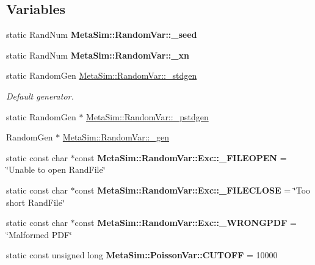 \subsection*{Variables}
\begin{DoxyCompactItemize}
\item 
static Rand\+Num {\bfseries Meta\+Sim\+::\+Random\+Var\+::\+\_\+seed}\hypertarget{group__metasim__random_gad037b5279195393ad61d448a631ef026}{}\label{group__metasim__random_gad037b5279195393ad61d448a631ef026}

\item 
static Rand\+Num {\bfseries Meta\+Sim\+::\+Random\+Var\+::\+\_\+xn}\hypertarget{group__metasim__random_ga942c2e335a84a00304b7920a6ee2c638}{}\label{group__metasim__random_ga942c2e335a84a00304b7920a6ee2c638}

\item 
static Random\+Gen \hyperlink{group__metasim__random_ga074de34f085259b7b9911e9f0a808d6b}{Meta\+Sim\+::\+Random\+Var\+::\+\_\+stdgen}\hypertarget{group__metasim__random_ga074de34f085259b7b9911e9f0a808d6b}{}\label{group__metasim__random_ga074de34f085259b7b9911e9f0a808d6b}

\begin{DoxyCompactList}\small\item\em Default generator. \end{DoxyCompactList}\item 
static Random\+Gen $\ast$ \hyperlink{group__metasim__random_ga920839e50710a224882a290bc132322d}{Meta\+Sim\+::\+Random\+Var\+::\+\_\+pstdgen}
\item 
Random\+Gen $\ast$ \hyperlink{group__metasim__random_ga64ccafdc8f32743c6b6bba7bfc1df4ff}{Meta\+Sim\+::\+Random\+Var\+::\+\_\+gen}
\item 
static const char $\ast$const {\bfseries Meta\+Sim\+::\+Random\+Var\+::\+Exc\+::\+\_\+\+F\+I\+L\+E\+O\+P\+EN} = \char`\"{}Unable to open Rand\+File\char`\"{}\hypertarget{group__metasim__random_gad70df72288377f42fcbbf83d02c58ae5}{}\label{group__metasim__random_gad70df72288377f42fcbbf83d02c58ae5}

\item 
static const char $\ast$const {\bfseries Meta\+Sim\+::\+Random\+Var\+::\+Exc\+::\+\_\+\+F\+I\+L\+E\+C\+L\+O\+SE} = \char`\"{}Too short Rand\+File\char`\"{}\hypertarget{group__metasim__random_ga0f916e4cb47dfc2db70f5a5f12f95ef7}{}\label{group__metasim__random_ga0f916e4cb47dfc2db70f5a5f12f95ef7}

\item 
static const char $\ast$const {\bfseries Meta\+Sim\+::\+Random\+Var\+::\+Exc\+::\+\_\+\+W\+R\+O\+N\+G\+P\+DF} = \char`\"{}Malformed P\+DF\char`\"{}\hypertarget{group__metasim__random_ga0560184f565fd1c7029cfc0fb8e9f106}{}\label{group__metasim__random_ga0560184f565fd1c7029cfc0fb8e9f106}

\item 
static const unsigned long {\bfseries Meta\+Sim\+::\+Poisson\+Var\+::\+C\+U\+T\+O\+FF} = 10000\hypertarget{group__metasim__random_ga79e2ab0f58f4932ca6c1821b6aeb6662}{}\label{group__metasim__random_ga79e2ab0f58f4932ca6c1821b6aeb6662}

\end{DoxyCompactItemize}


